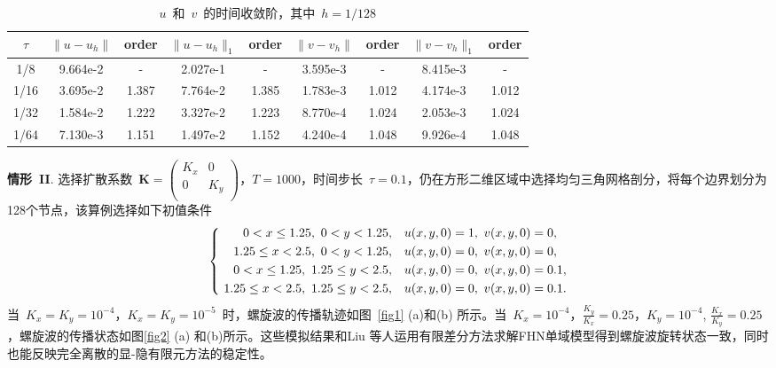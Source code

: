 \documentclass[twoside,UTF8]{nputhesis}
\begin{document}
\begin{table}[h]
	\centering
	\caption{$u$~和~$v$~的时间收敛阶，其中~$h=1/128$}\label{label4.1}
	\begin{tabular*}{\hsize}{@{}@{\extracolsep{\fill}}ccccccccc@{}}
		\hline$\tau$& $\| u-u_h\|$  & order   &$\| u-u_h\|_1$  &order   &  $\| v-v_h\|$    &order       & $\|v-v_h\|_1$    &order                          \\
		\hline1/8   & 9.664e-2  & -        &  2.027e-1          &  -       &  3.595e-3       &   -        & 8.415e-3      &   -                          \\
		1/16  & 3.695e-2  & 1.387     & 7.764e-2         &1.385     &  1.783e-3       &  1.012     & 4.174e-3      &1.012                         \\
		1/32  & 1.584e-2  & 1.222     & 3.327e-2         &1.223     &  8.770e-4       &  1.024     &2.053e-3       &1.024                     \\
		1/64  & 7.130e-3  & 1.151     & 1.497e-2         &1.152     &  4.240e-4       &  1.048     &9.926e-4       &1.048            \\
		
		\hline
	\end{tabular*}
\end{table}
\newpage
\textbf{情形~II}. 选择扩散系数~$\textbf{K}=\left(\begin{array}{cc}K_x & 0 \\0 & K_y \\ \end{array}\right)$，$T=1000$，时间步长~$\tau=0.1$，仍在方形二维区域中选择均匀三角网格剖分，将每个边界划分为128个节点，该算例选择如下初值条件
\begin{equation}
\left\{\begin{aligned} \mbox~0<x\leq 1.25,\,\,0<y<1.25,\quad &u(x,y,0)=1,\,\, v(x,y,0)=0, \\ \mbox~1.25\leq x<2.5,\,\,0<y<1.25,\quad &u(x,y,0)=0,\,\, v(x,y,0)=0, \\ \mbox~0<x\leq 1.25,\,\,1.25\leq y<2.5,\quad &u(x,y,0)=0,\,\, v(x,y,0)=0.1, \\ \mbox~1.25\leq x<2.5,\,\,1.25\leq y<2.5,\quad &u(x,y,0)=0,\,\, v(x,y,0)=0.1.\end{aligned}\right.
\label{bound}
\end{equation}
当~$K_x=K_y=10^{-4}$，$K_x=K_y=10^{-5}$~时，螺旋波的传播轨迹如图~\ref{fig1} (a)和(b) 所示。当~$K_x=10^{-4}$，$\frac{K_y}{K_x}=0.25$，$K_y=10^{-4}$, $\frac{K_x}{K_y}=0.25$，螺旋波的传播状态如图\ref{fig2} (a) 和(b)所示。这些模拟结果和Liu 等人\cite{fw2012}运用有限差分方法求解FHN单域模型得到螺旋波旋转状态一致，同时也能反映完全离散的显-隐有限元方法的稳定性。
\end{document}
